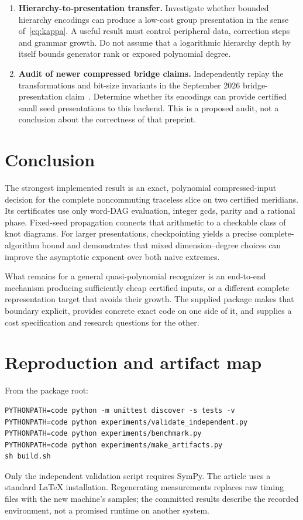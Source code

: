 \documentclass[11pt]{article}
\theoremstyle{definition}
\theoremstyle{remark}
\begin{document}
\begin{enumerate}[label=\textbf{Q\arabic*.},leftmargin=13mm]
\item \textbf{Hierarchy-to-presentation transfer.}
Investigate whether bounded hierarchy encodings can produce a low-cost group presentation in the sense of~\eqref{eq:kappa}. A useful result must control peripheral data, correction steps and grammar growth. Do not assume that a logarithmic hierarchy depth by itself bounds generator rank or exposed polynomial degree.

\item \textbf{Audit of newer compressed bridge claims.}
Independently replay the transformations and bit-size invariants in the September 2026 bridge-presentation claim~\cite{musick}. Determine whether its encodings can provide certified small seed presentations to this backend. This is a proposed audit, not a conclusion about the correctness of that preprint.
\end{enumerate}

\section{Conclusion}
The strongest implemented result is an exact, polynomial compressed-input decision for the complete noncommuting traceless slice on two certified meridians. Its certificates use only word-DAG evaluation, integer gcds, parity and a rational phase. Fixed-seed propagation connects that arithmetic to a checkable class of knot diagrams. For larger presentations, checkpointing yields a precise complete-algorithm bound and demonstrates that mixed dimension--degree choices can improve the asymptotic exponent over both naive extremes.

What remains for a general quasi-polynomial recognizer is an end-to-end mechanism producing sufficiently cheap certified inputs, or a different complete representation target that avoids their growth. The supplied package makes that boundary explicit, provides concrete exact code on one side of it, and supplies a cost specification and research questions for the other.

\appendix
\section{Reproduction and artifact map}
\label{sec:reproduce}
From the package root:
\begin{lstlisting}
PYTHONPATH=code python -m unittest discover -s tests -v
PYTHONPATH=code python experiments/validate_independent.py
PYTHONPATH=code python experiments/benchmark.py
PYTHONPATH=code python experiments/make_artifacts.py
sh build.sh
\end{lstlisting}
Only the independent validation script requires SymPy. The article uses a standard LaTeX installation. Regenerating measurements replaces raw timing files with the new machine's samples; the committed results describe the recorded environment, not a promised runtime on another system.
\end{document}
